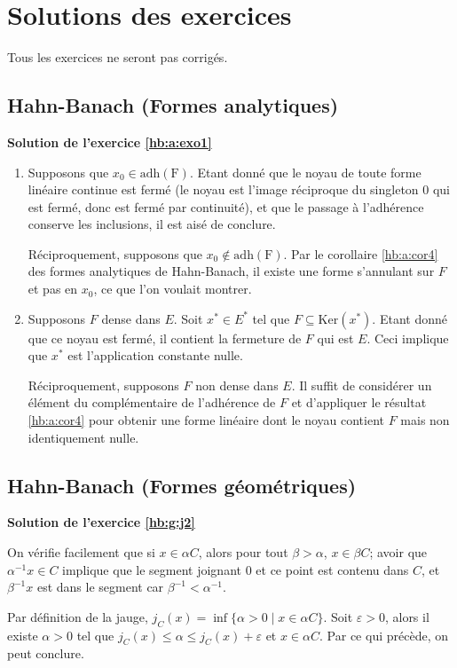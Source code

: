 \chapter{Solutions des exercices}
Tous les exercices ne seront pas corrigés.

\section{Hahn-Banach (Formes analytiques)}
\textbf{Solution de l'exercice \ref{hb:a:exo1}}

\begin{enumerate}
\item Supposons que $x_0\in \mathrm{adh(F)}$.
  Etant donné que le noyau de toute forme linéaire
  continue est fermé (le noyau est l'image réciproque du singleton
  0 qui est fermé, donc est fermé par continuité), et que le passage
  à l'adhérence conserve les inclusions, il est aisé de conclure.

  Réciproquement, supposons que $x_0\notin \mathrm{adh(F)}$.
  Par le corollaire \ref{hb:a:cor4} des formes analytiques de
  Hahn-Banach, il existe une forme s'annulant sur $F$ et pas
  en $x_0$, ce que l'on voulait montrer.
\item Supposons $F$ dense dans $E$. Soit $x^*\in E^*$ tel
  que $F\subseteq\mathrm{Ker}(x^*)$. Etant donné que ce
  noyau est fermé, il contient la fermeture de $F$ qui
  est $E$. Ceci implique que $x^*$ est l'application
  constante nulle.

  Réciproquement, supposons $F$ non dense dans $E$.
  Il suffit de considérer un élément du complémentaire
  de l'adhérence de $F$ et d'appliquer le résultat \ref{hb:a:cor4}
  pour obtenir une forme linéaire dont le noyau contient
  $F$ mais non identiquement nulle.
\end{enumerate}

\section{Hahn-Banach (Formes géométriques)}
\textbf{Solution de l'exercice \ref{hb:g:j2}}

On vérifie facilement que si $x\in \alpha C$, alors pour tout
$\beta >\alpha$, $x\in \beta C$;
avoir que $\alpha^{-1}x\in C$ implique que le segment joignant $0$ et ce
point est contenu dans $C$, et $\beta^{-1}x$ est dans le segment car
$\beta^{-1} <\alpha^{-1}$.

Par définition de la jauge, $j_C(x)= \inf\{\alpha > 0 \mid x\in \alpha C\}$.
Soit $\varepsilon >0$, alors il existe $\alpha > 0$ tel que $j_C(x)\leq
\alpha \leq j_C(x) + \varepsilon$ et $x\in\alpha C$. Par ce qui précède,
on peut conclure.

